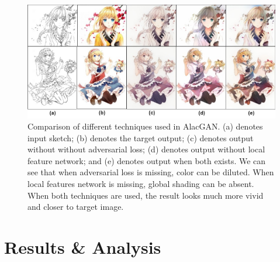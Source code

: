 \begin{figure}
    \centering
    \includegraphics[width=1.0\textwidth]{images/colorization/alacgan_features.jpg}
    \caption{Comparison of different techniques used in AlacGAN. (a) denotes input sketch; (b) denotes the target output; (c) denotes output without without adversarial loss; (d) denotes output without local feature network; and (e) denotes output when both exists. We can see that when adversarial loss is missing, color can be diluted. When local features network is missing, global shading can be absent. When both techniques are used, the result looks much more vivid and closer to target image.} 
    \label{fig:alacgan_features}
\end{figure}







\section{Results \& Analysis}

